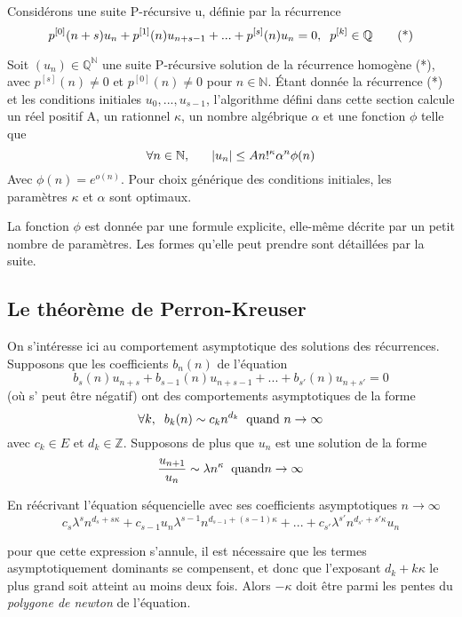 \documentclass[a4paper,10.5pt]{article}
\begin{document}
	Considérons une suite P-récursive u, définie par la récurrence
	\[p^{[0]}(n+s)u_{n}+p^{[1]}(n)u_{n+s-1}+...+p^{[s]}(n)u_{n}=0,\hspace{2mm} p^{[k]}\in \mathbb{Q} \tag{*}\] 
	\begin{theorem}Soit $(u_{n})\in \mathbb{Q}^{\mathbb{N}}$ une suite P-récursive solution de la récurrence homogène (*), avec $p^{[s]}(n) \neq 0$ et $p^{[0]}(n) \neq 0$ pour $n \in \mathbb{N}$. Étant donnée la récurrence (*) et les conditions initiales $u_{0},...,u_{s-1}$, l'algorithme défini dans cette section calcule un réel positif A, un rationnel $\kappa$, un nombre algébrique $\alpha$  et une fonction $\phi$ telle que
		\[\forall n\in \mathbb{N}, \hspace{6mm}|u_{n}| \leq A n!^{\kappa}\alpha^{n}\phi(n)\]
		Avec $\phi(n)=e^{o(n)}$. Pour choix générique des conditions initiales, les paramètres $\kappa$ et $\alpha$ sont optimaux.
	\end{theorem}
	
	La fonction $\phi$ est donnée par une formule explicite, elle-même décrite par un petit nombre de paramètres. Les formes qu'elle peut prendre sont détaillées par la suite.
	
	\subsection{Le théorème de Perron-Kreuser}
	
	On s'intéresse ici au comportement asymptotique des solutions des récurrences. Supposons que les coefficients $b_{n}(n)$ de l'équation
	\[b_{s}(n)u_{n+s}+b_{s-1}(n)u_{n+s-1}+...+b_{s'}(n)u_{n+s'}=0  \tag{*}\]
	(où s' peut être négatif) ont des comportements asymptotiques de la forme
	\[\forall k, \hspace{2mm} b_{k}(n) \sim c_{k}n^{d_{k}} \hspace{2mm} \text{quand } n \rightarrow \infty\]
	avec $c_{k} \in E$ et $d_{k} \in \mathbb{Z}$. Supposons de plus que $u_{n}$ est une solution de la forme  
	\[\frac{u_{n+1}}{u_{n}}\sim \lambda n^{\kappa} \hspace{2mm} \text{quand}n \rightarrow \infty\]
	
	\noindent En réécrivant l'équation séquencielle avec ses coefficients asymptotiques $n \rightarrow \infty$
	\[c_{s}\lambda^{s} n^{d_{s}+s\kappa}+c_{s-1}u_{n}\lambda^{s-1} n^{d_{s-1}+(s-1)\kappa}+...+c_{s'}\lambda^{s'} n^{d_{s'}+s'\kappa}u_{n}\]
	
	pour que cette expression s'annule, il est nécessaire que les termes asymptotiquement dominants se compensent, et donc que l'exposant $d_{k}+k\kappa$ le plus grand soit atteint au moins deux fois. Alors $-\kappa$ doit être parmi les pentes du \textit{polygone de newton} de l'équation.
	
\end{document}
